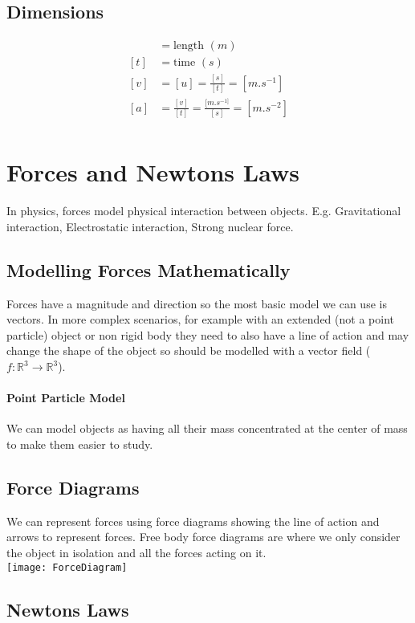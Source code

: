 \documentclass[class=article, crop=false]{standalone}
\begin{document}
\subsection*{Dimensions}
\begin{align*}
[s] & = \text{length } (m) \\
[t] & = \text{time } (s) \\
[v] & = [u] = \frac{[s]}{[t]} = [m.s^{-1}] \\
[a] & = \frac{[v]}{[t]} = \frac{[m.s^{-1]}}{[s]} = [m.s^{-2}] \\ 
\end{align*}
\section*{Forces and Newtons Laws}
In physics, forces model physical interaction between objects. E.g. Gravitational interaction, Electrostatic interaction, Strong nuclear force. \\
\subsection*{Modelling Forces Mathematically}
Forces have a magnitude and direction so the most basic model we can use is vectors. In more complex scenarios, for example with an extended (not a point particle) object or non rigid body they need to also have a line of action and may change the shape of the object so should be modelled with a vector field ($f:\mathbb{R}^3 \to \mathbb{R}^3$). \\
\paragraph*{Point Particle Model}
We can model objects as having all their mass concentrated at the center of mass to make them easier to study.
\subsection*{Force Diagrams}
We can represent forces using force diagrams showing the line of action and arrows to represent forces. Free body force diagrams are where we only consider the object in isolation and all the forces acting on it. \\
\texttt{[image: ForceDiagram]}\\
\subsection*{Newtons Laws}
\end{document}
